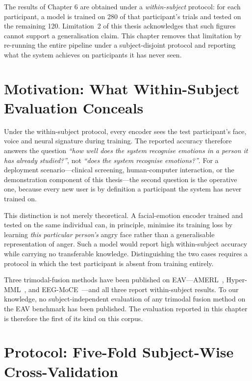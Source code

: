 The results of Chapter 6 are obtained under a \emph{within-subject} protocol: for
each participant, a model is trained on 280 of that participant's trials and tested
on the remaining 120. Limitation~2 of this thesis acknowledges that such figures
cannot support a generalisation claim. This chapter removes that limitation by
re-running the entire pipeline under a subject-disjoint protocol and reporting what
the system achieves on participants it has never seen.

\section{Motivation: What Within-Subject Evaluation Conceals}
\label{sec:cs_motivation}

Under the within-subject protocol, every encoder sees the test participant's face,
voice and neural signature during training. The reported accuracy therefore answers
the question \emph{``how well does the system recognise emotions in a person it has
already studied?''}, not \emph{``does the system recognise emotions?''}. For a
deployment scenario---clinical screening, human-computer interaction, or the
demonstration component of this thesis---the second question is the operative one,
because every new user is by definition a participant the system has never trained on.

This distinction is not merely theoretical. A facial-emotion encoder trained and
tested on the same individual can, in principle, minimise its training loss by
learning \emph{this particular person's} angry face rather than a generalisable
representation of anger. Such a model would report high within-subject accuracy while
carrying no transferable knowledge. Distinguishing the two cases requires a protocol
in which the test participant is absent from training entirely.

Three trimodal-fusion methods have been published on
EAV---AMERL~\cite{Yin2024AMERL}, Hyper-MML~\cite{Kang2025HyperMML}, and
EEG-MoCE~\cite{Anon2026EEGMoCE}---and all three report within-subject results.
To our knowledge, no subject-independent evaluation of any trimodal fusion method on
the EAV benchmark has been published. The evaluation reported in this chapter is
therefore the first of its kind on this corpus.

\section{Protocol: Five-Fold Subject-Wise Cross-Validation}
\label{sec:cs_protocol}


